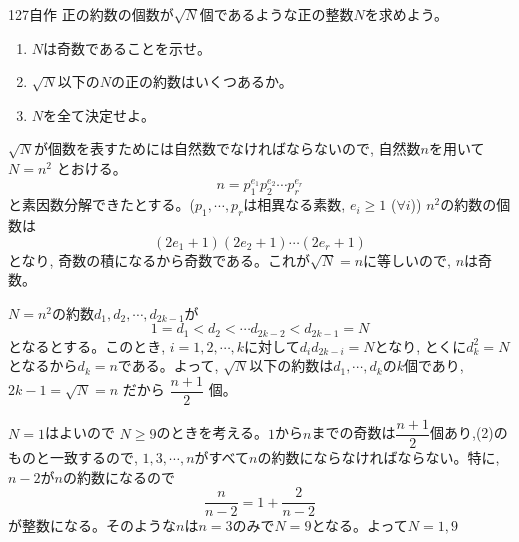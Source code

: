 \begin{prob}{127}{}{自作}
 正の約数の個数が$\sqrt{N}$個であるような正の整数$N$を求めよう。
 \begin{enumerate}
  \item $N$は奇数であることを示せ。
  \item $\sqrt{N}$以下の$N$の正の約数はいくつあるか。
  \item $N$を全て決定せよ。
 \end{enumerate}
\end{prob}
$\sqrt{N}$が個数を表すためには自然数でなければならないので,  自然数$n$を用いて $N=n^2$ とおける。
\[n=p_1^{e_1}p_2^{e_2}\cdots p_r^{e_r}\]
と素因数分解できたとする。($p_1, \cdots, p_r$は相異なる素数, $e_i\geq 1$ ($\forall i$)) $n^2$の約数の個数は
\[(2e_1+1)(2e_2+1)\cdots (2e_r +1)\]
となり, 奇数の積になるから奇数である。これが$\sqrt{N}=n$に等しいので, $n$は奇数。

$N=n^2$の約数$d_1,d_2,\cdots, d_{2k-1}$が
\[1=d_1<d_2<\cdots d_{2k-2}<d_{2k-1}=N\]
となるとする。このとき, $i=1,2,\cdots ,k$に対して$d_id_{2k-i}=N$となり, とくに$d_k^2=N$となるから$d_k=n$である。よって, $\sqrt{N}$以下の約数は$d_1,\cdots, d_k$の$k$個であり, $2k-1=\sqrt{N}=n$ だから $\dfrac{n+1}{2}$ 個。

$N=1$はよいので $N\geq 9$のときを考える。$1$から$n$までの奇数は$\dfrac{n+1}{2}$個あり,(2)のものと一致するので, $1,3,\cdots, n$がすべて$n$の約数にならなければならない。特に, $n-2$が$n$の約数になるので
\[\dfrac{n}{n-2}=1+\dfrac{2}{n-2}\]
が整数になる。そのような$n$は$n=3$のみで$N=9$となる。よって$N=1,9$


